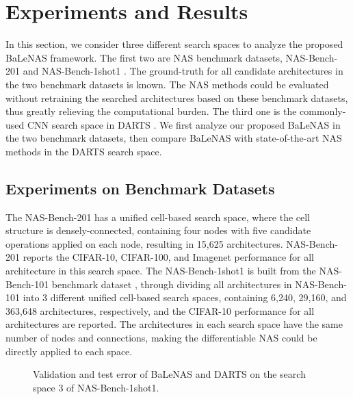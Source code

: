 \documentclass[10pt,twocolumn,letterpaper]{article}
\begin{document}
\section{Experiments and Results}
In this section, we consider three different search spaces to analyze the proposed BaLeNAS framework. The first two are NAS benchmark datasets, NAS-Bench-201 \cite{BENCH102} and NAS-Bench-1shot1 \cite{zela2020nasbench1shot1}. The ground-truth for all candidate architectures in the two benchmark datasets is known. The NAS methods could be evaluated without retraining the searched architectures based on these benchmark datasets, thus greatly relieving the computational burden. The third one is the commonly-used CNN search space in DARTS \cite{liu2018darts}. We first analyze our proposed BaLeNAS in the two benchmark datasets, then compare BaLeNAS with state-of-the-art NAS methods in the DARTS search space. 





\vspace{-1mm}
\subsection{Experiments on Benchmark Datasets}
The NAS-Bench-201 \cite{BENCH102} has a unified cell-based search space, where the cell structure is densely-connected, containing four nodes with five candidate operations applied on each node, resulting in 15,625 architectures. NAS-Bench-201 reports the CIFAR-10, CIFAR-100, and Imagenet performance for all architecture in this search space. The NAS-Bench-1shot1 \cite{zela2020nasbench1shot1} is built from the NAS-Bench-101 benchmark dataset \cite{ying2019bench}, through dividing all architectures in NAS-Bench-101 into 3 different unified cell-based search spaces, containing 6,240, 29,160, and 363,648 architectures, respectively, and the CIFAR-10 performance for all architectures are reported. The architectures in each search space have the same number of nodes and connections, making the differentiable NAS could be directly applied to each space. 


\begin{figure}[t]
\centering
  
 \caption{Validation and test error of BaLeNAS and DARTS on the search space 3 of NAS-Bench-1shot1. }
 \label{fig:compa_nas1shot1}
 \vspace{-2mm}
\end{figure}
\end{document}
